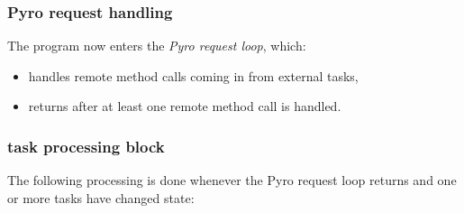 \documentclass[a4paper,12pt]{amsart}
\begin{document}
\subsubsection{Pyro request handling}

The program now enters the {\em Pyro request loop}, which:

    \begin{itemize}
    \item handles remote method calls coming in from external tasks, 
    \item returns after at least one remote method call is handled. 
    \end{itemize}

\subsubsection{task processing block} 

The following processing is done whenever the Pyro request loop returns
and one or more tasks have changed state: 
\end{document}
